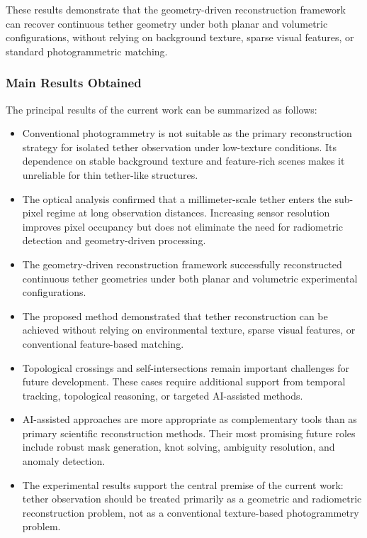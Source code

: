 These results demonstrate that the geometry-driven reconstruction framework can recover continuous tether geometry under both planar and volumetric configurations, without relying on background texture, sparse visual features, or standard photogrammetric matching.

\subsubsection{Main Results Obtained}
\label{subsub:stereo_vision_main_results}

The principal results of the current work can be summarized as follows:

\begin{itemize}
    \item Conventional photogrammetry is not suitable as the primary reconstruction strategy for isolated tether observation under low-texture conditions. Its dependence on stable background texture and feature-rich scenes makes it unreliable for thin tether-like structures.
    \item The optical analysis confirmed that a millimeter-scale tether enters the sub-pixel regime at long observation distances. Increasing sensor resolution improves pixel occupancy but does not eliminate the need for radiometric detection and geometry-driven processing.
    \item The geometry-driven reconstruction framework successfully reconstructed continuous tether geometries under both planar and volumetric experimental configurations.
    \item The proposed method demonstrated that tether reconstruction can be achieved without relying on environmental texture, sparse visual features, or conventional feature-based matching.
    \item Topological crossings and self-intersections remain important challenges for future development. These cases require additional support from temporal tracking, topological reasoning, or targeted AI-assisted methods.
    \item AI-assisted approaches are more appropriate as complementary tools than as primary scientific reconstruction methods. Their most promising future roles include robust mask generation, knot solving, ambiguity resolution, and anomaly detection.
    \item The experimental results support the central premise of the current work: tether observation should be treated primarily as a geometric and radiometric reconstruction problem, not as a conventional texture-based photogrammetry problem.
\end{itemize}


